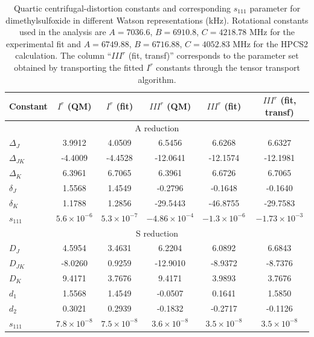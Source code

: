 \documentclass[aip,jcp,reprint,floatfix]{revtex4-2}
\begin{document}
\begin{table}[t]
\centering
\caption{Quartic centrifugal-distortion constants and corresponding
$s_{111}$ parameter for dimethylsulfoxide in different Watson
representations (kHz). Rotational constants used in the analysis are
$A=7036.6$, $B=6910.8$, $C=4218.78$ MHz for the experimental fit and
$A=6749.88$, $B=6716.88$, $C=4052.83$ MHz for the HPCS2 calculation.
The column ``$III^r$ (fit, transf)'' corresponds to the parameter set
obtained by transporting the fitted $I^r$ constants through the tensor
transport algorithm.}
\begin{tabular}{lccccc}
\hline
Constant & $I^r$ (QM) & $I^r$ (fit) & $III^r$ (QM) & $III^r$ (fit) & $III^r$ (fit, transf) \\
\hline

\multicolumn{6}{c}{A reduction} \\

$\Delta_J$    & 3.9912 & 4.0509 & 6.5456 & 6.6268 & 6.6327 \\
$\Delta_{JK}$ & -4.4009 & -4.4528 & -12.0641 & -12.1574 & -12.1981 \\
$\Delta_K$    & 6.3961 & 6.7065 & 6.3961 & 6.6726 & 6.7065 \\
$\delta_J$    & 1.5568 & 1.4549 & -0.2796 & -0.1648 & -0.1640 \\
$\delta_K$    & 1.1788 & 1.2856 & -29.5443 & -46.8755 & -29.7583 \\
$s_{111}$     & $5.6\times10^{-6}$ & $5.3\times10^{-7}$ & $-4.86\times10^{-4}$ & $-1.3\times10^{-6}$ & $-1.73\times10^{-3}$ \\

\hline

\multicolumn{6}{c}{S reduction} \\

$D_J$         & 4.5954 & 3.4631 & 6.2204 & 6.0892 & 6.6843 \\
$D_{JK}$      & -8.0260 & 0.9259 & -12.9010 & -8.9372 & -8.7376 \\
$D_K$         & 9.4171 & 3.7676 & 9.4171 & 3.9893 & 3.7676 \\
$d_1$         & 1.5568 & 1.4549 & -0.0507 & 0.1641 & 1.5850 \\
$d_2$         & 0.3021 & 0.2939 & -0.1832 & -0.2717 & -0.1126 \\
$s_{111}$     & $7.8\times10^{-8}$ & $7.5\times10^{-8}$ & $3.6\times10^{-8}$ & $3.5\times10^{-8}$ & $3.5\times10^{-8}$ \\

\hline
\end{tabular}
\label{tab:DMSO_constants}
\end{table}
\end{document}
